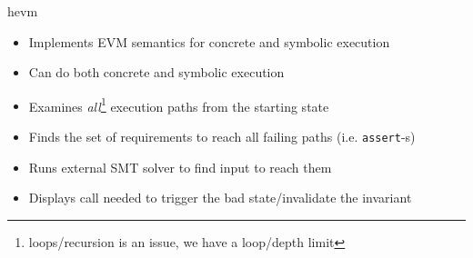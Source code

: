 \documentclass[aspectratio=169]{beamer}
\begin{document}
\begin{frame}{hevm}
\begin{itemize}
\item Implements EVM semantics for concrete and symbolic execution
\item Can do both concrete and symbolic execution
\item Examines \emph{all}\footnote{loops/recursion is an issue, we have a loop/depth limit} execution paths from the starting state
\item Finds the set of requirements to reach all failing paths (i.e. \texttt{assert}-s)
\item Runs external SMT solver to find input to reach them
\item Displays call needed to trigger the bad state/invalidate the invariant
\end{itemize}
\end{frame}







%
%
%



%	
%
\end{document}
